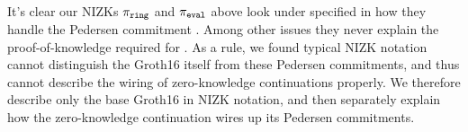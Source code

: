 It's clear our NIZKs $\piring$ and $\pieval$ above look under specified
in how they handle the Pedersen commitment \compk.  Among other issues
they never explain the proof-of-knowledge required for \compk.
As a rule, we found typical NIZK notation cannot distinguish the Groth16
itself from these Pedersen commitments, and thus cannot describe the
wiring of zero-knowledge continuations properly.
We therefore describe only the base Groth16 in NIZK notation, and then
separately explain how the zero-knowledge continuation wires up its
Pedersen commitments.



\endinput 






















\smallskip

We explain this zero-knowledge continuation $\piring$ in detail
in \S\ref{sec:rvrf_cont}.  Yet first in \S\ref{sec:pederson_vrf}
we introduce an extremely efficient instantiation for $\pieval$, which
also provides the required proof-of-knowledge for \compk.



\endinput 

We shall discuss several variations on $\piring$, as alterations impact
deployment dramatically.  Yet we know interesting variations on $\pieval$
as well, including schemes with post-quantum anonymity, but not post-quantum soundness.

\endinput 

  As an example, if one employs hash functions for \CommitKey
and \PRF, and certain zkSNARKs for $\pieval$, then one obtains post-quantum
anonymity, although not post-quantum soundness.

